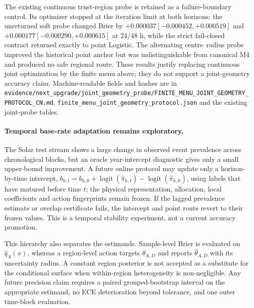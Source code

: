 \documentclass[11pt,a4paper]{article}
\numberwithin{equation}{section}
\theoremstyle{definition}\newtheorem{definition}[theorem]{Definition}
\theoremstyle{remark}\newtheorem{remark}[theorem]{Remark}
\begin{document}
The existing continuous trust-region probe is retained as a failure-boundary control. Its optimizer stopped at the iteration limit at both horizons; the unreturned soft probe changed Brier by $+0.000037[-0.000452,+0.000519]$ and $+0.000177[-0.000290,+0.000615]$ at 24/48 h, while the strict fail-closed contract returned exactly to point Logistic. The alternating centre--radius probe improved the historical point anchor but was indistinguishable from canonical M4 and produced no safe regional route. These results justify replacing continuous joint optimization by the finite menu above; they do not support a joint-geometry accuracy claim. Machine-readable fields and hashes are in \texttt{evidence/next\_upgrade/joint\_geometry\_probe/FINITE\_MENU\_JOINT\_GEOMETRY\_PROTOCOL\_CN.md}, \texttt{finite\_menu\_joint\_geometry\_protocol.json} and the existing joint-probe tables.

\paragraph{Temporal base-rate adaptation remains exploratory.}
The Solar test stream shows a large change in observed event prevalence across chronological blocks, but an oracle year-intercept diagnostic gives only a small upper-bound improvement. A future online protocol may update only a horizon-by-time intercept, $b_{h,t}=b_{h,0}+\operatorname{logit}(\widehat\pi_{h,t})-\operatorname{logit}(\widehat\pi_{h,0})$, using labels that have matured before time $t$; the physical representation, allocation, local coefficients and action fingerprints remain frozen. If the lagged prevalence estimate or overlap certificate fails, the intercept and point route revert to their frozen values. This is a temporal stability experiment, not a current accuracy promotion.


This hierarchy also separates the estimands. Sample-level Brier is evaluated on $\widehat q_A(x)$, whereas a region-level action targets $\theta_{A,D}$ and reports $\widehat\theta_{A,D}$ with its uncertainty radius. A constant region posterior is not accepted as a substitute for the conditional surface when within-region heterogeneity is non-negligible. Any future precision claim requires a paired grouped-bootstrap interval on the appropriate estimand, no ECE deterioration beyond tolerance, and one outer time-block evaluation.
\end{document}
